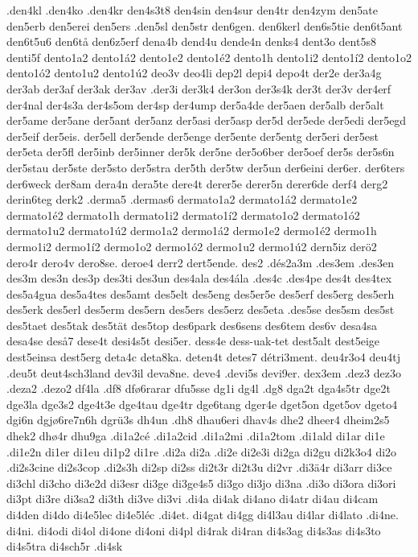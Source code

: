 .den4kl
.den4ko
.den4kr
den4s3t8
den4sin
den4sur
den4tr
den4zym
den5ate
den5erb
den5erei
den5ers
.den5sl
den5str
den6gen.
den6kerl
den6s5tie
den6t5ant
den6t5u6
den6tå
den6z5erf
dena4b
dend4u
dende4n
denks4
dent3o
dent5s8
denti5f
dento1a2
dento1á2
dento1e2
dento1é2
dento1h
dento1i2
dento1í2
dento1o2
dento1ó2
dento1u2
dento1ú2
deo3v
deo4li
dep2l
depi4
depo4t
der2e
der3a4g
der3ab
der3af
der3ak
der3av
.der3i
der3k4
der3on
der3s4k
der3t
der3v
der4erf
der4nal
der4s3a
der4s5om
der4sp
der4ump
der5a4de
der5aen
der5alb
der5alt
der5ame
der5ane
der5ant
der5anz
der5asi
der5asp
der5d
der5ede
der5edi
der5egd
der5eif
der5eis.
der5ell
der5ende
der5enge
der5ente
der5entg
der5eri
der5est
der5eta
der5fl
der5inb
der5inner
der5k
der5ne
der5o6ber
der5oef
der5s
der5s6n
der5stau
der5ste
der5sto
der5stra
der5th
der5tw
der5un
der6eini
der6er.
der6ters
der6weck
der8am
dera4n
dera5te
dere4t
derer5e
derer5n
derer6de
derf4
derg2
derin6teg
derk2
.derma5
.dermas6
dermato1a2
dermato1á2
dermato1e2
dermato1é2
dermato1h
dermato1i2
dermato1í2
dermato1o2
dermato1ó2
dermato1u2
dermato1ú2
dermo1a2
dermo1á2
dermo1e2
dermo1é2
dermo1h
dermo1i2
dermo1í2
dermo1o2
dermo1ó2
dermo1u2
dermo1ú2
dern5iz
derö2
dero4r
dero4v
dero8se.
deroe4
derr2
dert5ende.
des2
.dés2a3m
.des3em
.des3en
des3m
des3n
des3p
des3ti
des3un
des4ala
des4ála
.des4c
.des4pe
des4t
des4tex
des5a4gua
des5a4tes
des5amt
des5elt
des5eng
des5er5e
des5erf
des5erg
des5erh
des5erk
des5erl
des5erm
des5ern
des5ers
des5erz
des5eta
.des5se
des5sm
des5st
des5taet
des5tak
des5tät
des5top
des6park
des6sens
des6tem
des6v
desa4sa
desa4se
deså7
dese4t
desi4s5t
desi5er.
dess4e
dess-uak-tet
dest5alt
dest5eige
dest5einsa
dest5erg
deta4c
deta8ka.
deten4t
detes7
détri3ment.
deu4r3o4
deu4tj
.deu5t
deut4sch3land
dev3il
deva8ne.
deve4
.devi5s
devi9er.
dex3em
.dez3
dez3o
.deza2
.dezo2
df4la
.df8
dfø6rarar
dfu5sse
dg1i
dg4l
.dg8
dga2t
dga4s5tr
dge2t
dge3la
dge3s2
dge4t3e
dge4tau
dge4tr
dge6tang
dger4e
dget5on
dget5ov
dgeto4
dgi6n
dgjø6re7n6h
dgrü3s
dh4un
.dh8
dhau6eri
dhav4s
dhe2
dheer4
dheim2s5
dhek2
dhø4r
dhu9ga
.di1a2cé
.di1a2cid
.di1a2mi
.di1a2tom
.di1ald
di1ar
di1e
.di1e2n
di1er
di1eu
di1p2
di1re
.di2a
di2a
.di2e
di2e3i
di2ga
di2gu
di2k3o4
di2o
.di2s3cine
di2s3cop
.di2s3h
di2sp
di2ss
di2t3r
di2t3u
di2vr
.di3ä4r
di3arr
di3ce
di3chl
di3cho
di3e2d
di3esr
di3ge
di3ge4s5
di3go
di3jo
di3na
.di3o
di3ora
di3ori
di3pt
di3re
di3sa2
di3th
di3ve
di3vi
.di4a
di4ak
di4ano
di4atr
di4au
di4cam
di4den
di4do
di4e5lec
di4e5léc
.di4et.
di4gat
di4gg
di4l3au
di4lar
di4lato
.di4ne.
di4ni.
di4odi
di4ol
di4one
di4oni
di4pl
di4rak
di4ran
di4s3ag
di4s3as
di4s3to
di4s5tra
di4sch5r
.di4sk
